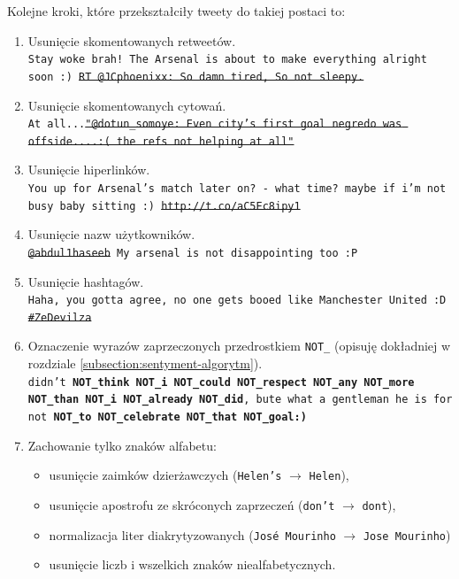 Kolejne kroki, które przekształciły tweety do takiej postaci to:
\begin{enumerate}
  \item Usunięcie skomentowanych retweetów.\\
  \texttt{Stay woke brah! The Arsenal is about to make everything
  alright soon :) \sout{RT @JCphoenixx: So damn tired, So not sleepy.}}
  
  \item Usunięcie skomentowanych cytowań. \\
  \texttt{At all...\sout{"@dotun\_somoye: Even city's first goal
  negredo was offside....:( the refs not helping at all"} }
  
  \item Usunięcie hiperlinków.\\
  \texttt{You up for Arsenal's match later on? - what time? maybe if i'm not
  busy baby sitting :) \sout{http://t.co/aC5Ec8ipy1}}
 
  
  \item Usunięcie nazw użytkowników.\\
  \texttt{\sout{@abdul1haseeb} My arsenal is not disappointing too :P}
  
  
  \item Usunięcie hashtagów. \\
  \texttt{Haha, you gotta agree, no one gets booed like Manchester United :D
  \sout{\#ZeDevilza}}
  
  
  \item Oznaczenie wyrazów zaprzeczonych przedrostkiem \texttt{NOT\_} (opisuję
  dokładniej w rozdziale \ref{subsection:sentyment-algorytm}). \\
  \texttt{didn't \textbf{NOT\_think NOT\_i NOT\_could NOT\_respect NOT\_any 
  NOT\_more NOT\_than NOT\_i NOT\_already NOT\_did}, bute what a gentleman he 
  is for not \textbf{NOT\_to NOT\_celebrate NOT\_that NOT\_goal:)}}

 \item Zachowanie tylko znaków alfabetu:
  	\begin{itemize}
  		\item usunięcie zaimków dzierżawczych (\texttt{Helen's} $\to$ \texttt{Helen}),
  		\item usunięcie apostrofu ze skróconych zaprzeczeń (\texttt{don't} $\to$ \texttt{dont}),
  		\item normalizacja liter diakrytyzowanych (\texttt{José Mourinho} $\to$ \texttt{Jose
  		Mourinho})
  		\item usunięcie liczb i wszelkich znaków niealfabetycznych.
	\end{itemize}


\end{enumerate}
